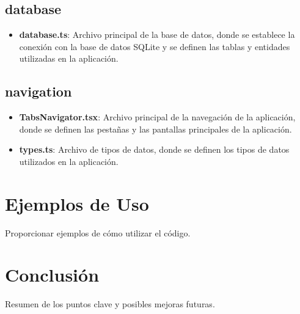\documentclass[a4paper,12pt]{article}
\begin{document}
\subsection{database}

\begin{itemize}
    \item \textbf{database.ts}: Archivo principal de la base de datos, donde se establece la conexión con la base de datos SQLite y se definen las tablas y entidades utilizadas en la aplicación.
\end{itemize}

\subsection{navigation}

\begin{itemize}
    \item \textbf{TabsNavigator.tsx}: Archivo principal de la navegación de la aplicación, donde se definen las pestañas y las pantallas principales de la aplicación.
    \item \textbf{types.ts}: Archivo de tipos de datos, donde se definen los tipos de datos utilizados en la aplicación.
\end{itemize}


\section{Ejemplos de Uso}
Proporcionar ejemplos de cómo utilizar el código.

\section{Conclusión}
Resumen de los puntos clave y posibles mejoras futuras.
\end{document}
